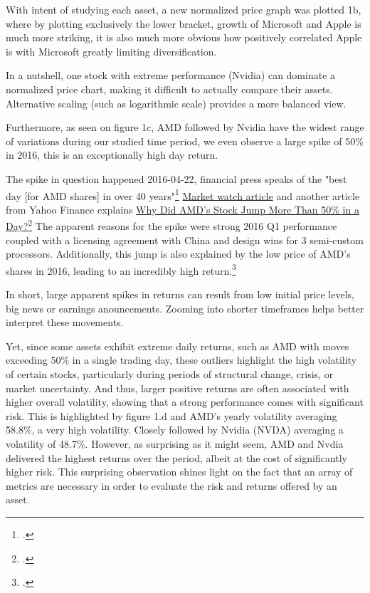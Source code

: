 \documentclass{article}
\begin{document}
With intent of studying each asset, a new normalized price graph was plotted 1b, where by plotting exclusively the lower bracket, growth of Microsoft and Apple is much more striking, it is also much more obvious how positively correlated Apple is with Microsoft greatly limiting diversification.

\vspace{0.3cm}
In a nutshell, one stock with extreme performance (Nvidia) can dominate a normalized price chart, making it difficult to actually compare their assets. Alternative scaling (such as logarithmic scale) provides a more balanced view.



Furthermore, as seen on figure 1c, AMD followed by Nvidia have the widest range of variations during our studied time period, we even observe a large spike of 50\% in 2016, this is an exceptionally high day return.

\vspace{0.3cm}
The spike in question happened 2016-04-22, financial press speaks of the "best day [for AMD shares] in over 40 years"\footcite{marketwatch_amd} \textcolor{blue}{\href{https://www.marketwatch.com/story/amds-stock-has-best-day-in-40-years-after-china-jv-deal-q1-results-2016-04-22}{Market watch article}} and another article from Yahoo Finance explains \textcolor{blue}{\href{https://finance.yahoo.com/news/why-did-amd-stock-jump-154505561.html?guccounter=1}{Why Did AMD’s Stock Jump More Than 50\% in a Day?}}\footcite{yahoo_amd_jump}
The apparent reasons for the spike were strong 2016 Q1 performance coupled with a licensing agreement with China and design wins for 3 semi-custom processors.
Additionally, this jump is also explained by the low price of AMD's shares in 2016, leading to an incredibly high return.\footcite{forbes_amd}

\vspace{0.3cm}
In short, large apparent spikes in returns can result from low initial price levels, big news or earnings anouncements. Zooming into shorter timeframes helps better interpret these movements.

\vspace{0.3cm}
Yet, since some assets exhibit extreme daily returns, such as AMD with moves exceeding 50\% in a single trading day, these outliers highlight the high volatility of certain stocks, particularly during periods of structural change, crisis, or market uncertainty. And thus, larger positive returns are often associated with higher overall volatility, showing that a strong performance comes with significant risk. This is highlighted by figure 1.d and AMD's yearly volatility averaging 58.8\%, a very high volatility. Closely followed by Nvidia (NVDA) averaging a volatility of 48.7\%. However, as surprising as it might seem, AMD and Nvdia delivered the highest returns over the period, albeit at the cost of significantly higher risk. This surprising observation shines light on the fact that an array of metrics are necessary in order to evaluate the risk and returns offered by an asset.
\end{document}
